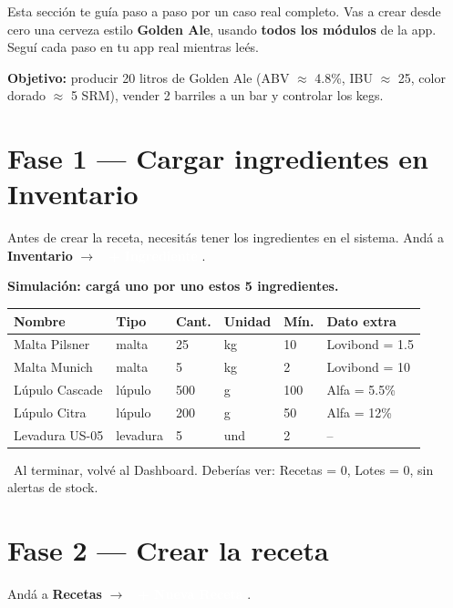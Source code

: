 \documentclass[11pt,a4paper]{report}
\newcommand{\appbtn}[1]{%
  \textcolor{white}{\colorbox{beer}{\footnotesize\sffamily\bfseries\ #1}}%
}
\begin{document}
Esta sección te guía paso a paso por un caso real completo. Vas a crear desde cero una cerveza estilo \textbf{Golden Ale}, usando \textbf{todos los módulos} de la app. Seguí cada paso en tu app real mientras leés.

{\large\color{accent}\textbf{Objetivo:}} producir 20 litros de Golden Ale (ABV $\approx$ 4.8\%, IBU $\approx$ 25, color dorado $\approx$ 5 SRM), vender 2 barriles a un bar y controlar los kegs.

\vspace{8pt}

\section{Fase 1 — Cargar ingredientes en Inventario}

Antes de crear la receta, necesitás tener los ingredientes en el sistema. Andá a \textbf{Inventario} $\to$ \appbtn{+ Ingrediente}.

\begin{simbox}
\textbf{Simulación: cargá uno por uno estos 5 ingredientes.}

\medskip
\begin{tabular}{llllll}
\toprule
\textbf{Nombre} & \textbf{Tipo} & \textbf{Cant.} & \textbf{Unidad} & \textbf{Mín.} & \textbf{Dato extra} \\
\midrule
Malta Pilsner    & malta    & 25 & kg & 10 & Lovibond = 1.5 \\
Malta Munich     & malta    & 5  & kg & 2  & Lovibond = 10 \\
Lúpulo Cascade   & lúpulo   & 500 & g & 100 & Alfa = 5.5\% \\
Lúpulo Citra     & lúpulo   & 200 & g & 50  & Alfa = 12\% \\
Levadura US-05   & levadura & 5   & und & 2  & -- \\
\bottomrule
\end{tabular}

\medskip
\textcolor{accent}{\faArrowRight\ Al terminar, volvé al Dashboard. Deberías ver: Recetas = 0, Lotes = 0, sin alertas de stock.}
\end{simbox}

\section{Fase 2 — Crear la receta}

Andá a \textbf{Recetas} $\to$ \appbtn{+ Nueva Receta}.
\end{document}
